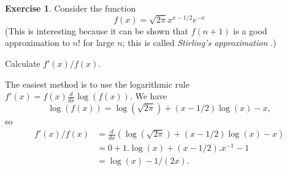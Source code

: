 \documentclass[a4paper]{book}
\newcommand{\PURPLE}[1]{{\color{purple}#1}}
\renewcommand{\:}{\colon}
\newcommand{\mathworld}[1]{}
\newcommand{\DEFN}[1]{\PURPLE{\emph{#1}}}
\theoremstyle{definition}
\newtheorem{exercise}[theorem]{Exercise}
\renewenvironment{solution}{\SolutionInline}{\endSolutionInline}
\begin{document}
\begin{exercise}
 Consider the function 
 \[ f(x) = \sqrt{2\pi} x^{x-1/2} e^{-x} \]
 (This is interesting because it can be shown that $f(n+1)$ is a good
 approximation to $n!$ for large $n$; this is called \DEFN{Stirling's
   approximation} \mathworld{StirlingsApproximation}.)

 Calculate $f'(x)/f(x)$.
\end{exercise}
\begin{solution}
 The easiest method is to use the logarithmic rule 
 $f'(x)=f(x)\frac{d}{dx}\log(f(x))$.  We have
 \[ \log(f(x)) = \log(\sqrt{2\pi}) + (x-1/2)\log(x) - x, \]
 so
 \begin{align*}
  f'(x)/f(x)
   &= \frac{d}{dx}(\log(\sqrt{2\pi}) + (x-1/2)\log(x) - x) \\
   &= 0 + 1.\log(x) + (x-1/2).x^{-1} - 1 \\
   &= \log(x) - 1/(2x).
 \end{align*}
\end{solution}
\end{document}
